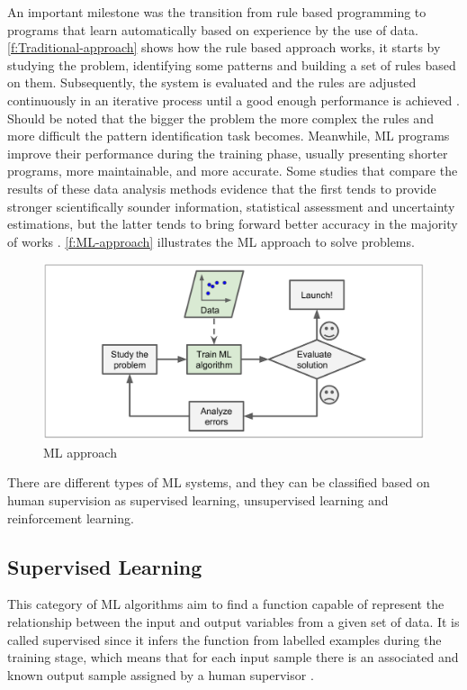An important milestone was the transition from rule based programming to programs that learn automatically based on experience by the use of data. \autoref{f:Traditional-approach} shows how the rule based approach works, it starts by studying the problem, identifying some patterns and building a set of rules based on them. Subsequently, the system is evaluated and the rules are adjusted continuously in an iterative process until a good enough performance is achieved \cite{geron2017}. Should be noted that the bigger the problem the more complex the rules and more difficult the pattern identification task becomes. Meanwhile, \ac{ML} programs improve their performance during the training phase, usually presenting shorter programs, more maintainable, and more accurate. Some studies that compare the results of these data analysis methods evidence that the first tends to provide stronger scientifically sounder information, statistical assessment and uncertainty estimations, but the latter tends to bring forward better accuracy in the majority of works \cite{geron2017,Ye2020}. \autoref{f:ML-approach} illustrates the \ac{ML} approach to solve problems.

\begin{figure}[h]
\centering
\includegraphics[width=\linewidth]{figures/Ch2/Ml-Approach.png}
\caption{ML approach \cite{geron2017}}
\label{f:ML-approach}
\end{figure}

There are different types of \ac{ML} systems, and they can be classified based on human supervision as supervised learning, unsupervised learning and reinforcement learning. 

\subsection{Supervised Learning}
This category of \ac{ML} algorithms aim to find a function capable of represent the relationship between the input and output variables from a given set of data. It is called supervised since it infers the function from labelled examples during the training stage, which means that for each input sample there is an associated and known output sample assigned by a human supervisor \cite{Batta2020}. 

